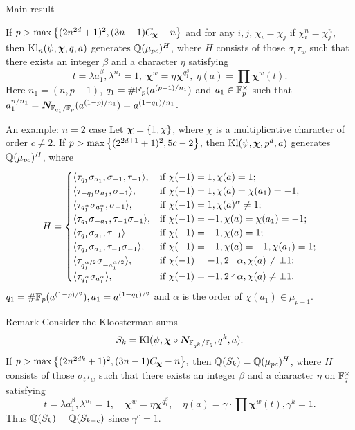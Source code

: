 \documentclass[aspectratio=169,handout]{beamer}
\newcommand\bchi{{\boldsymbol\chi}}
\begin{document}
\begin{frame}{Main result}
\begin{theorem}[Z.]
If $p>\max\set{(2n^{2d}+1)^2,(3n-1)C_\bchi-n}$ and for any $i,j$, $\chi_i=\chi_j$ if $\chi_i^n=\chi_j^n$, then $\Kl_n(\psi,\bchi,q,a)$ generates ${\mathbb{Q}}(\mu_{pc})^H$, where $H$ consists of those $\sigma_t\tau_w$ such that there exists an integer $\beta$ and a character $\eta$ satisfying
  \[t=\lambda a_1^\beta,\lambda^{n_1}=1,\ \bchi^w=\eta\bchi^{q_1^\beta},\ \eta(a)=\prod\bchi^w(t).\]
Here $n_1=(n,p-1)$, $q_1=\#{\mathbb{F}}_p(a^{(p-1)/n_1})$ and $a_1\in{\mathbb{F}}_p^\times$ such that $a_1^{n/n_1}={\boldsymbol{N}}_{{\mathbb{F}}_{q_1}/{\mathbb{F}}_p}(a^{(1-p)/n_1})=a^{(1-q_1)/n_1}$.
\end{theorem}
\end{frame}


\begin{frame}{An example: $n=2$ case}
Let $\bchi=\set{1,\chi}$, where $\chi$ is a multiplicative character of order $c\neq 2$.
If $p>\max{\left\{(2^{2d+1}+1)^2,5c-2\right\}}$, then $\Kl(\psi,\bchi,p^d,a)$ generates ${\mathbb{Q}}(\mu_{pc})^H$, where 
	\[H=
	\begin{cases}
		\langle{\tau_{q_1}\sigma_{a_1},\sigma_{-1},\tau_{-1}}\rangle,
			&\text{if}\ \chi(-1)=1,\chi(a)=1;\\
		\langle{\tau_{-q_1}\sigma_{a_1},\sigma_{-1}}\rangle,
			&\text{if}\ \chi(-1)=1,\chi(a)=\chi(a_1)=-1;\\
		\langle{\tau_{q_1^{\alpha}}\sigma_{a_1^\alpha},\sigma_{-1}}\rangle,
			&\text{if}\ \chi(-1)=1,\chi(a)^\alpha\neq 1;\\
		\langle{\tau_{q_1}\sigma_{-a_1},\tau_{-1}\sigma_{-1}}\rangle,
			&\text{if}\ \chi(-1)=-1, \chi(a)=\chi(a_1)=-1;\\
		\langle{\tau_{q_1}\sigma_{a_1},\tau_{-1}}\rangle
			&\text{if}\ \chi(-1)=-1, \chi(a)=1;\\
		\langle{\tau_{q_1}\sigma_{a_1},\tau_{-1}\sigma_{-1}}\rangle,
			&\text{if}\ \chi(-1)=-1,\chi(a)=-1,\chi(a_1)=1;\\
		\langle{\tau_{q_1^{\alpha/2}}\sigma_{-a_1^{\alpha/2}}}\rangle,
			&\text{if}\ \chi(-1)=-1,2\mid \alpha,\chi(a)\neq \pm1;\\
		\langle{\tau_{q_1^{\alpha}}\sigma_{a_1^\alpha}}\rangle,
			&\text{if}\ \chi(-1)=-1,2\nmid \alpha,\chi(a)\neq \pm1.
	\end{cases}\]
 $q_1=\#{\mathbb{F}}_p(a^{(1-p)/2}), a_1=a^{(1-q_1)/2}$ and $\alpha$ is the order of $\chi(a_1)\in\mu_{p-1}$.

\end{frame}


\begin{frame}{Remark}
Consider the Kloosterman sums
	\[S_k=\Kl(\psi,\bchi\circ\bfN_{\BF_{q^k}/\BF_q},q^k,a).\]
If $p>\max\set{(2n^{2dk}+1)^2,(3n-1)C_\bchi-n},$ then ${\mathbb{Q}}(S_k)={\mathbb{Q}}(\mu_{pc})^H$, where $H$ consists of those $\sigma_t\tau_w$ such that there exists an integer $\beta$ and a character $\eta$ on ${\mathbb{F}}_q^\times$ satisfying
	\[	t=\lambda a_1^\beta,\lambda^{n_1}=1,\quad \bchi^w=\eta\bchi^{q_1^\beta},\quad \eta(a)=\gamma\cdot\prod\bchi^w(t),\gamma^k=1.\]
Thus ${\mathbb{Q}}(S_k)={\mathbb{Q}}(S_{k-c})$ since $\gamma^c=1$.

\end{frame}
\end{document}
